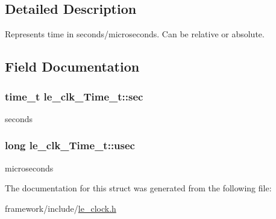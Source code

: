 \subsection{Detailed Description}
Represents time in seconds/microseconds. Can be relative or absolute. 

\subsection{Field Documentation}
\subsubsection[{\texorpdfstring{sec}{sec}}]{\setlength{\rightskip}{0pt plus 5cm}time\+\_\+t le\+\_\+clk\+\_\+\+Time\+\_\+t\+::sec}\hypertarget{structle__clk___time__t_ae28e527dbd551b3537edc1737611782f}{}\label{structle__clk___time__t_ae28e527dbd551b3537edc1737611782f}


seconds 

\subsubsection[{\texorpdfstring{usec}{usec}}]{\setlength{\rightskip}{0pt plus 5cm}long le\+\_\+clk\+\_\+\+Time\+\_\+t\+::usec}\hypertarget{structle__clk___time__t_a8324bdde9199a09a47489a3f246f184c}{}\label{structle__clk___time__t_a8324bdde9199a09a47489a3f246f184c}


microseconds 



The documentation for this struct was generated from the following file\+:\begin{DoxyCompactItemize}
\item 
framework/include/\hyperlink{le__clock_8h}{le\+\_\+clock.\+h}\end{DoxyCompactItemize}
